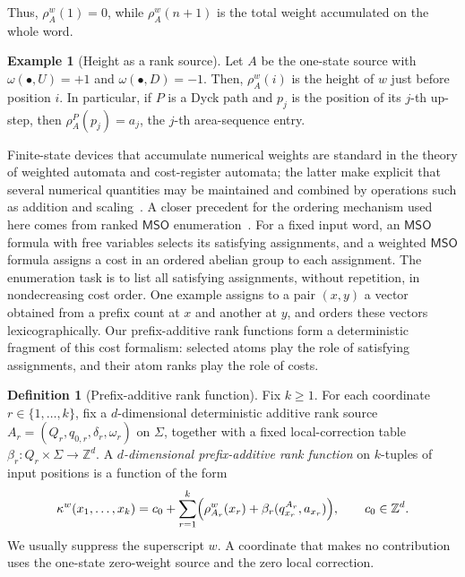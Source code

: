 \documentclass[11pt]{article}
\theoremstyle{definition}
\newtheorem{definition}[theorem]{Definition}
\newtheorem{example}[theorem]{Example}
\newcommand{\Z}{\mathbb Z}
\newcommand{\MSO}{\mathsf{MSO}}
\begin{document}
Thus, $\rho_A^w(1)=0$, while $\rho_A^w(n+1)$ is the total weight accumulated
on the whole word.

\begin{example}[Height as a rank source]\label{ex:height-rank}
Let $A$ be the one-state source with
$\omega(\bullet,U)=+1$ and $\omega(\bullet,D)=-1$.  Then, $\rho_A^w(i)$ is the
height of $w$ just before position $i$.  In particular, if $P$ is a Dyck path
and $p_j$ is the position of its $j$-th up-step, then
$\rho_A^P(p_j)=a_j$, the $j$-th area-sequence entry.
\end{example}

Finite-state devices that accumulate numerical weights are standard in the
theory of weighted automata and cost-register automata; the latter make
explicit that several numerical quantities may be maintained and combined by
operations such as addition and scaling~\cite{AlurEtAl2013}.  A closer
precedent for the ordering mechanism used here comes from ranked $\MSO$
enumeration~\cite{BourhisEtAl2021}.  For a fixed input word, an $\MSO$ formula
with free variables selects its satisfying assignments, and a weighted $\MSO$
formula assigns a cost in an ordered abelian group to each assignment.  The
enumeration task is to list all satisfying assignments, without repetition,
in nondecreasing cost order.  One example assigns to a pair $(x,y)$ a vector
obtained from a prefix count at $x$ and another at $y$, and orders these
vectors lexicographically.  Our prefix-additive rank functions form a
deterministic fragment of this cost formalism: selected atoms play the role of
satisfying assignments, and their atom ranks play the role of costs.

\begin{definition}[Prefix-additive rank function]
\label{def:prefix-additive-rank}
Fix $k\ge 1$.  For each coordinate $r\in\{1,\ldots,k\}$, fix a
$d$-dimensional deterministic additive rank source
$A_r=(Q_r,q_{0,r},\delta_r,\omega_r)$ on $\Sigma$, together with a fixed
local-correction table
$\beta_r\colon Q_r\times\Sigma\to\Z^d$.  A
\emph{$d$-dimensional prefix-additive rank function} on $k$-tuples of input
positions is a function of the form
\[
   \kappa^w(x_1,\ldots,x_k)
   =c_0+\sum_{r=1}^{k}
       \Bigl(\rho_{A_r}^w(x_r)
             +\beta_r(q^{A_r}_{x_r},a_{x_r})\Bigr),
   \qquad c_0\in\Z^d.
\]
We usually suppress the superscript $w$.  A coordinate that makes no
contribution uses the one-state zero-weight source and the zero local
correction.
\end{definition}
\end{document}
